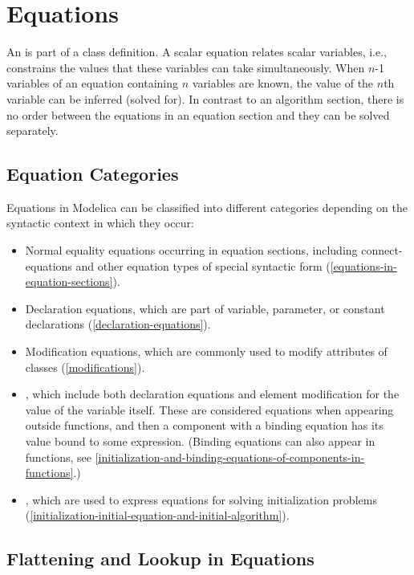 \chapter{Equations}\label{equations}

An  is part of a class definition.
A scalar equation relates scalar variables, i.e., constrains the values that these variables can take simultaneously.
When $n$-1 variables of an equation containing $n$ variables are known, the value of the $n$th variable can be inferred (solved for).
In contrast to an algorithm section, there is no order between the equations in an equation section and they can be solved separately.

\section{Equation Categories}\label{equation-categories}

Equations in Modelica can be classified into different categories depending on the syntactic context in which they occur:
\begin{itemize}
\item
  Normal equality equations occurring in equation sections, including connect-equations and other equation types of special syntactic form (\cref{equations-in-equation-sections}).
\item
  Declaration equations, which are part of variable, parameter, or constant declarations (\cref{declaration-equations}).
\item
  Modification equations, which are commonly used to modify attributes of classes (\cref{modifications}).
\item
  , which include both declaration equations and element modification for the value of the variable itself.
  These are considered equations when appearing outside functions, and then a component with a binding equation has its value bound to some expression.
  (Binding equations can also appear in functions, see \cref{initialization-and-binding-equations-of-components-in-functions}.)
\item
  , which are used to express equations for solving initialization problems (\cref{initialization-initial-equation-and-initial-algorithm}).
\end{itemize}


\section{Flattening and Lookup in Equations}\label{flattening-and-lookup-in-equations}

